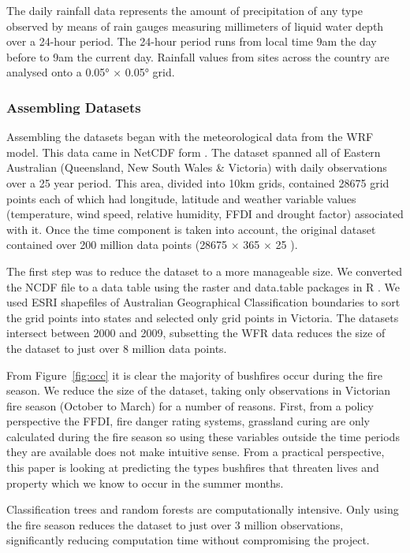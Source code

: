 \documentclass[11pt,a4paper]{article}
\begin{document}
The daily rainfall data represents the amount of precipitation of any type observed by means of rain gauges measuring millimeters of liquid water depth over a 24-hour period. The 24-hour period runs from local time 9am the day before to 9am the current day. Rainfall values from sites across the country are analysed onto a 0.05° × 0.05° grid.



\subsubsection{Assembling Datasets}

Assembling the datasets began with the meteorological data from the WRF model. This data came in NetCDF form \citep{ncdf}. The dataset spanned all of Eastern Australian (Queensland, New South Wales \& Victoria) with daily observations over a 25 year period. This area, divided into 10km grids, contained 28675 grid points each of which had longitude, latitude and weather variable values (temperature, wind speed, relative humidity, FFDI and drought factor) associated with it. Once the time component is taken into account, the original dataset contained over 200 million data points (28675 $\times$ 365 $\times$ 25 ).

The first step was to reduce the dataset to a more manageable size. We converted the NCDF file to a data table using the raster and data.table packages in R \citep{raster, datatable}. We used ESRI shapefiles of Australian Geographical Classification boundaries \citep{ABS1259} to sort the grid points into states and selected only grid points in Victoria. The datasets intersect between 2000 and 2009, subsetting the WFR data reduces the size of the dataset to just over 8 million data points.

From Figure~\ref{fig:occ} it is clear the majority of bushfires occur during the fire season. We reduce the size of the dataset, taking only observations in Victorian fire season (October to March) for a number of reasons. First, from a policy perspective the FFDI, fire danger rating systems, grassland curing are only calculated during the fire season so using these variables outside the time periods they are available does not make intuitive sense. From a practical perspective, this paper is looking at predicting the types bushfires that threaten lives and property which we know to occur in the summer months.

Classification trees and random forests are computationally intensive. Only using the fire season reduces the dataset to just over 3 million observations, significantly reducing computation time without compromising the project.
\end{document}
